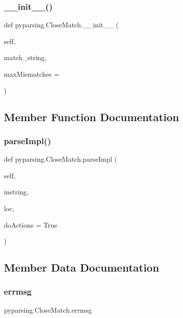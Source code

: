 \subsubsection{\texorpdfstring{\+\_\+\+\_\+init\+\_\+\+\_\+()}{\_\_init\_\_()}}
{\footnotesize\ttfamily def pyparsing.\+Close\+Match.\+\_\+\+\_\+init\+\_\+\+\_\+ (\begin{DoxyParamCaption}\item[{}]{self,  }\item[{}]{match\+\_\+string,  }\item[{}]{max\+Mismatches = {} }\end{DoxyParamCaption})}



\subsection{Member Function Documentation}
\mbox{\label{classpyparsing_1_1CloseMatch_a39964b36aee9d9ccfdb96cdd57d144b7}} 
\subsubsection{\texorpdfstring{parse\+Impl()}{parseImpl()}}
{\footnotesize\ttfamily def pyparsing.\+Close\+Match.\+parse\+Impl (\begin{DoxyParamCaption}\item[{}]{self,  }\item[{}]{instring,  }\item[{}]{loc,  }\item[{}]{do\+Actions = {\ttfamily True} }\end{DoxyParamCaption})}



\subsection{Member Data Documentation}
\mbox{\label{classpyparsing_1_1CloseMatch_a25815a38f8bcc15a785a3822e8fbde83}} 
\subsubsection{\texorpdfstring{errmsg}{errmsg}}
{\footnotesize\ttfamily pyparsing.\+Close\+Match.\+errmsg}

